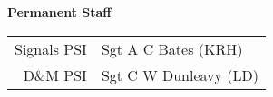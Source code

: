 \begin{center}
  \Large
  \textbf{Permanent Staff}
\end{center}

\begin{center}
  \begin{tabular}{rl}
    Signals PSI & Sgt A C Bates (KRH) \\
    D\&M PSI & Sgt C W Dunleavy (LD) \\
  \end{tabular}
\end{center}
